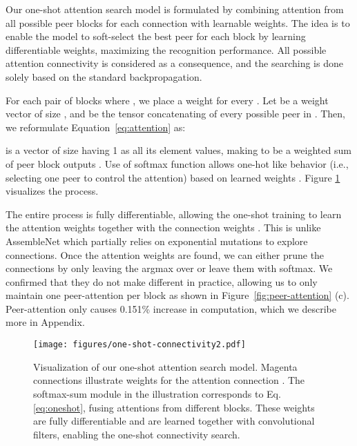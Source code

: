 \documentclass[runningheads]{llncs}
\begin{document}
Our one-shot attention search model is formulated by combining attention from all possible peer blocks for each connection with learnable weights.
The idea is to enable the model to soft-select the best peer for each block by learning differentiable weights, maximizing the recognition performance. 
All possible attention connectivity is considered as a consequence, and the searching is done solely based on the standard backpropagation.













For each pair of blocks  where , we place a weight for every . Let  be a weight vector of size , and  be the tensor concatenating  of every possible peer  in . Then, we reformulate Equation~\ref{eq:attention} as:

 is a vector of size  having 1 as all its element values, making  to be a weighted sum of peer block outputs . Use of softmax function allows one-hot like behavior (i.e., selecting one peer to control the attention) based on learned weights . Figure \ref{fig:one-shot} visualizes the process.



The entire process is fully differentiable, allowing the one-shot training to learn the attention weights  together with the connection weights . This is unlike AssembleNet which partially relies on exponential mutations to explore connections. Once the attention weights are found, we can either prune the connections by only leaving the argmax over  or leave them with softmax. We confirmed that they do not make different in practice, allowing us to only maintain one peer-attention per block as shown in Figure~\ref{fig:peer-attention} (c). Peer-attention only causes 0.151\% increase in computation, which we describe more in Appendix.











\begin{figure}
  \centering
  \texttt{[image: figures/one-shot-connectivity2.pdf]}
  \caption{Visualization of our one-shot attention search model. Magenta connections illustrate weights for the attention connection . The softmax-sum module in the illustration corresponds to Eq. \ref{eq:oneshot}, fusing attentions from different blocks. These weights are fully differentiable and are learned together with convolutional filters, enabling the one-shot connectivity search.}
  \label{fig:one-shot}
\end{figure}
\end{document}
